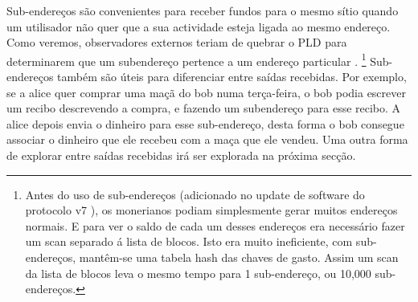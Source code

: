 Sub-endereços são convenientes para receber fundos para o mesmo sítio quando um utilisador não quer que a sua actividade esteja ligada ao mesmo endereço. Como veremos, observadores externos teriam de quebrar o PLD para determinarem que um subendereço pertence a um endereço particular \cite{MRL-0006-subaddresses}.
\footnote{Antes do uso de sub-endereços (adicionado no update de software do protocolo v7 \cite{subaddress-pull-request}), os monerianos podiam simplesmente gerar muitos endereços normais. E para ver o saldo de cada um desses endereços era necessário fazer um scan separado á lista de blocos. Isto era muito ineficiente, com sub-endereços, mantêm-se uma tabela hash das chaves de gasto. Assim um scan da lista de blocos leva o mesmo tempo para 1 sub-endereço, ou 10,000 sub-endereços.} 
Sub-endereços também são úteis para diferenciar entre saídas recebidas. Por exemplo, se a alice quer comprar uma maçã do bob numa terça-feira, o bob podia escrever um recibo descrevendo a compra, e fazendo um subendereço para esse recibo. A alice depois envia o dinheiro para esse sub-endereço, desta forma o bob consegue associar o dinheiro que ele recebeu com a maça que ele vendeu. Uma outra forma de explorar entre saídas recebidas irá ser explorada na próxima secção. 

